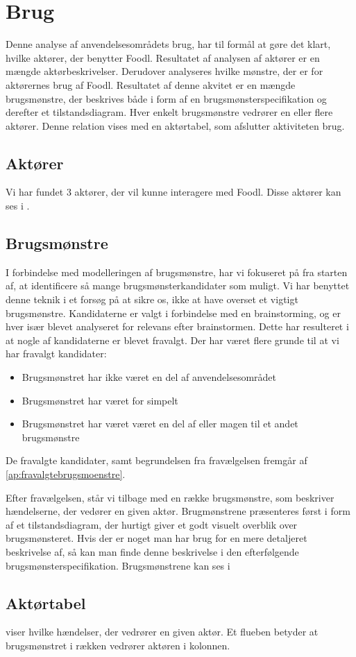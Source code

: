 \section{Brug}
\label{sec:brug}
Denne analyse af anvendelsesområdets brug, har til formål at gøre det klart, hvilke aktører, der benytter Foodl. Resultatet af analysen af aktører er en mængde aktørbeskrivelser. Derudover analyseres hvilke mønstre, der er for aktørernes brug af Foodl. Resultatet af denne akvitet er en mængde brugsmønstre, der beskrives både i form af en brugsmønsterspecifikation og derefter et tilstandsdiagram. Hver enkelt brugsmønstre vedrører en eller flere aktører. Denne relation vises med en aktørtabel, som afslutter aktiviteten brug.

\subsection{Aktører}
Vi har fundet 3 aktører, der vil kunne interagere med Foodl. Disse aktører kan ses i .



\subsection{Brugsmønstre}
I forbindelse med modelleringen af brugsmønstre, har vi fokuseret på fra starten af, at identificere så mange brugsmønsterkandidater som muligt. Vi har benyttet denne teknik i et forsøg på at sikre os, ikke at have overset et vigtigt brugsmønstre. Kandidaterne er valgt i forbindelse med en brainstorming, og er hver især blevet analyseret for relevans efter brainstormen. Dette har resulteret i at nogle af kandidaterne er blevet fravalgt. Der har været flere grunde til at vi har fravalgt kandidater:
\begin{itemize}
\item Brugsmønstret har ikke været en del af anvendelsesområdet
\item Brugsmønstret har været for simpelt
\item Brugsmønstret har været været en del af eller magen til et andet brugsmønstre
\end{itemize}
De fravalgte kandidater, samt begrundelsen fra fravælgelsen fremgår af \ref{ap:fravalgtebrugsmoenstre}.

Efter fravælgelsen, står vi tilbage med en række brugsmønstre, som beskriver hændelserne, der vedører en given aktør. Brugmønstrene præsenteres først i form af et tilstandsdiagram, der hurtigt giver et godt visuelt overblik over brugsmønsteret. Hvis der er noget man har brug for en mere detaljeret beskrivelse af, så kan man finde denne beskrivelse i den efterfølgende brugsmønsterspecifikation.
Brugsmønstrene kan ses i 


\subsection{Aktørtabel}
 viser hvilke hændelser, der vedrører en given aktør. Et flueben betyder at brugsmønstret i rækken vedrører aktøren i kolonnen.





